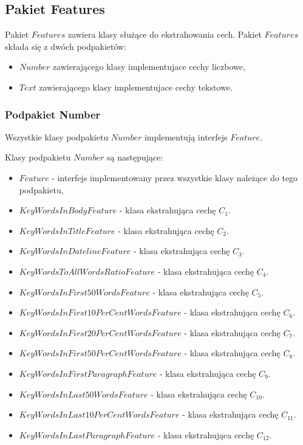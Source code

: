 \documentclass{classrep}
\begin{document}
\subsection{Pakiet Features}
Pakiet $Features$ zawiera klasy służące do ekstrahowania cech. Pakiet $Features$ składa się z dwóch podpakietów:
\begin{itemize}[label=$\bullet$\scshape\bfseries]
\item $Number$ zawierającego klasy implementujace cechy liczbowe,
\item $Text$ zawierającego klasy implementujace cechy tekstowe.
\end{itemize}

\subsubsection{Podpakiet Number}
Wszystkie klasy podpakietu $Number$ implementują interfejs $Feature$. \newline

Klasy podpakietu $Number$ są następujące:
\begin{itemize}[label=$\bullet$\scshape\bfseries]
\item $Feature$ - interfejs implementowany przez wszystkie klasy należące do tego podpakietu,
\item $KeyWordsInBodyFeature$ - klasa ekstrahująca cechę $C_{1}$.
\item $KeyWordsInTitleFeature$ - klasa ekstrahująca cechę $C_{2}$.
\item $KeyWordsInDatelineFeature$ - klasa ekstrahująca cechę $C_{3}$.
\item $KeyWordsToAllWordsRatioFeature$ - klasa ekstrahująca cechę $C_{4}$.
\item $KeyWordsInFirst50WordsFeature$ - klasa ekstrahująca cechę $C_{5}$.
\item $KeyWordsInFirst10PerCentWordsFeature$ - klasa ekstrahująca cechę $C_{6}$.
\item $KeyWordsInFirst20PerCentWordsFeature$ - klasa ekstrahująca cechę $C_{7}$.
\item $KeyWordsInFirst50PerCentWordsFeature$ - klasa ekstrahująca cechę $C_{8}$.
\item $KeyWordsInFirstParagraphFeature$ - klasa ekstrahująca cechę $C_{9}$.
\item $KeyWordsInLast50WordsFeature$ - klasa ekstrahująca cechę $C_{10}$.
\item $KeyWordsInLast10PerCentWordsFeature$ - klasa ekstrahująca cechę $C_{11}$.
\item $KeyWordsInLastParagraphFeature$ - klasa ekstrahująca cechę $C_{12}$.\newline
\end{itemize}
\end{document}
